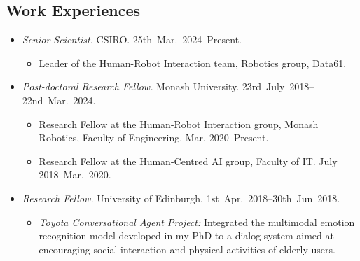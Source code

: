 \documentclass[11pt,letterpaper]{article}
\begin{document}
\subsection*{Work Experiences}
\begin{itemize}
  \item \emph{Senior Scientist.} CSIRO. 25th~Mar.~2024--Present.
  \begin{itemize}
  	\item Leader of the Human-Robot Interaction team, Robotics group, Data61.
  \end{itemize}
  \item \emph{Post-doctoral Research Fellow.} Monash University. 23rd~July~2018--22nd~Mar.~2024.
  \begin{itemize}
  	\item Research Fellow at the Human-Robot Interaction group, Monash Robotics, Faculty of Engineering. Mar. 2020--Present.
  	\item Research Fellow at the Human-Centred AI group, Faculty of IT. July 2018--Mar.~2020.
  \end{itemize}
  \item \emph{Research Fellow.} University of Edinburgh. 1st~Apr.~2018--30th~Jun~2018.
  \begin{itemize}
    \item \emph{Toyota Conversational Agent Project:} Integrated the multimodal emotion recognition model developed in my PhD to a dialog system aimed at encouraging social interaction and physical activities of elderly users.
  \end{itemize}

\end{itemize}
\end{document}
